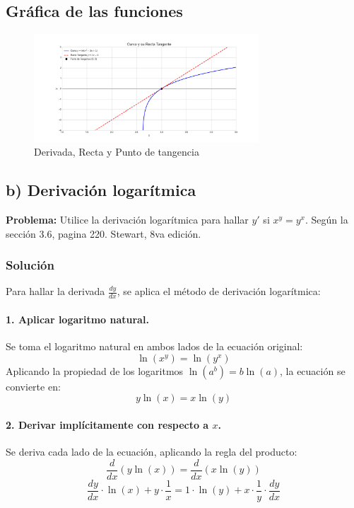 \documentclass[12pt, letterpaper]{article}
\begin{document}
\subsection*{Gráfica de las funciones}
\begin{figure}[h]
    \centering
    \includegraphics[width=0.75\textwidth]{Figure_2.png}
    \caption{Derivada, Recta y Punto de tangencia}
    \label{fig:Figure_2}
\end{figure}

\newpage
\subsection*{b) Derivación logarítmica}
\textbf{Problema:} Utilice la derivación logarítmica para hallar $y'$ si $x^y = y^x$. Según la sección 3.6, pagina 220. Stewart, 8va edición.

\subsubsection*{Solución}
Para hallar la derivada $\frac{dy}{dx}$, se aplica el método de derivación logarítmica:

\paragraph{1. Aplicar logaritmo natural.}
Se toma el logaritmo natural en ambos lados de la ecuación original:
$$
\ln(x^y) = \ln(y^x)
$$
Aplicando la propiedad de los logaritmos $\ln(a^b) = b\ln(a)$, la ecuación se convierte en:
$$
y \ln(x) = x \ln(y)
$$

\paragraph{2. Derivar implícitamente con respecto a $x$.}
Se deriva cada lado de la ecuación, aplicando la regla del producto:
$$
\frac{d}{dx}(y \ln(x)) = \frac{d}{dx}(x \ln(y))
$$
$$
\frac{dy}{dx} \cdot \ln(x) + y \cdot \frac{1}{x} = 1 \cdot \ln(y) + x \cdot \frac{1}{y} \cdot \frac{dy}{dx}
$$
\end{document}
